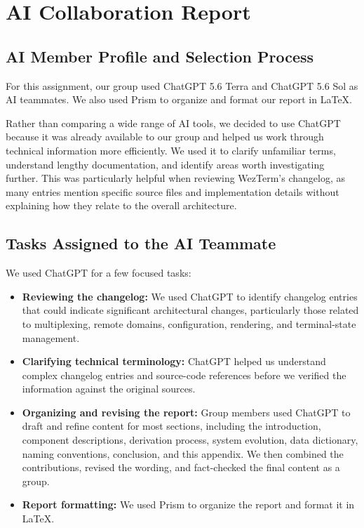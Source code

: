 \section{AI Collaboration Report}
\label{sec:ai-report}

\subsection{AI Member Profile and Selection Process}
\label{sec:ai-profile}

For this assignment, our group used ChatGPT 5.6 Terra and ChatGPT 5.6 Sol as AI teammates. We also used Prism to organize and format our report in LaTeX.

Rather than comparing a wide range of AI tools, we decided to use ChatGPT because it was already available to our group and helped us work through technical information more efficiently. We used it to clarify unfamiliar terms, understand lengthy documentation, and identify areas worth investigating further. This was particularly helpful when reviewing WezTerm's changelog, as many entries mention specific source files and implementation details without explaining how they relate to the overall architecture.

\subsection{Tasks Assigned to the AI Teammate}
\label{sec:ai-tasks}

We used ChatGPT for a few focused tasks:
\begin{itemize}

  \item \textbf{Reviewing the changelog:} We used ChatGPT to identify changelog entries that could indicate significant architectural changes, particularly those related to multiplexing, remote domains, configuration, rendering, and terminal-state management.

  \item \textbf{Clarifying technical terminology:} ChatGPT helped us understand complex changelog entries and source-code references before we verified the information against the original sources.

  \item \textbf{Organizing and revising the report:} Group members used ChatGPT to draft and refine content for most sections, including the introduction, component descriptions, derivation process, system evolution, data dictionary, naming conventions, conclusion, and this appendix. We then combined the contributions, revised the wording, and fact-checked the final content as a group.

  \item \textbf{Report formatting:} We used Prism to organize the report and format it in LaTeX.
\end{itemize}

